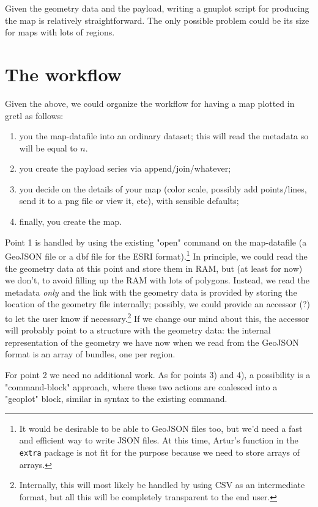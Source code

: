 \documentclass[a4paper]{article}
\begin{document}
Given the geometry data and the payload, writing a gnuplot script for
producing the map is relatively straightforward. The only possible
problem could be its size for maps with lots of regions.

\section{The workflow}
\label{sec:workflow}

Given the above, we could organize the workflow for having a map
plotted in gretl as follows:

\begin{enumerate}
\item you  the map-datafile into an ordinary dataset; this
  will read the metadata so  will be equal to $n$.
\item you create the payload series via append/join/whatever;
\item you decide on the details of your map (color scale, possibly
  add points/lines, send it to a png file or view it, etc), with
  sensible defaults;
\item finally, you create the map. 
\end{enumerate}

Point 1 is handled by using the existing "open" command on the
map-datafile (a GeoJSON file or a dbf file for the ESRI
format).\footnote{It would be desirable to be able to 
  GeoJSON files too, but we'd need a fast and efficient way to write
  JSON files. At this time, Artur's function in the \texttt{extra}
  package is not fit for the purpose because we need to store arrays
  of arrays.} In principle, we could read the the geometry data at
this point and store them in RAM, but (at least for now) we don't, to
avoid filling up the RAM with lots of polygons. Instead, we read the
metadata \emph{only} and the link with the geometry data is provided
by storing the location of the geometry file internally; possibly, we
could provide an accessor (?)  to let the user know if
necessary.\footnote{Internally, this will most likely be handled by
  using CSV as an intermediate format, but all this will be completely
  transparent to the end user.} If we change our mind about this, the
 accessor will probably point to a structure with the
geometry data: the internal representation of the geometry we have now
when we read from the GeoJSON format is an array of bundles, one per
region.

For point 2 we need no additional work. As for points 3) and 4), a
possibility is a "command-block" approach, where these two actions are
coalesced into a "geoplot" block, similar in syntax to the existing
 command.
\end{document}

